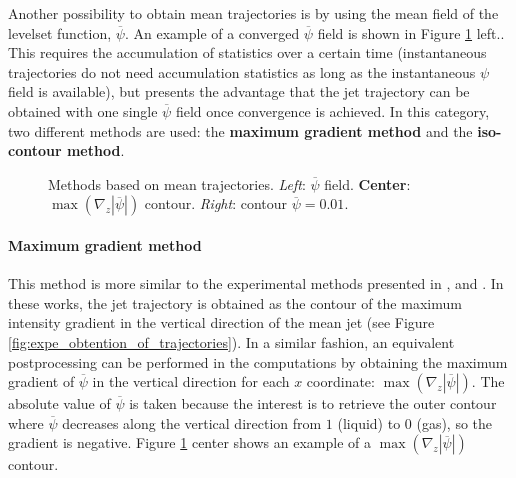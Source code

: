 Another possibility to obtain mean trajectories is by using the mean field of the levelset function, $\overline{\psi}$. An example of a converged $\overline{\psi}$ field is shown in Figure \ref{fig:trajectory_obtention_mean_methods_c_d} left.. This requires the accumulation of statistics over a certain time (instantaneous trajectories do not need accumulation statistics as long as the instantaneous $\psi$ field is available), but presents the advantage that the jet trajectory can be obtained with one single $\overline{\psi}$ field once convergence is achieved. In this category, two different methods are used: the \textbf{maximum gradient method} and the \textbf{iso-contour method}.

\begin{figure}[ht]
     \centering
     \caption[Methods based on mean trajectories]{Methods based on mean trajectories. \textsl{Left}: $\overline{\psi}$ field. \textbf{Center}: $\max \left( \nabla_z | \overline{\psi} | \right)$ contour. \textsl{Right}: contour $\overline{\psi} = 0.01$.}
      \label{fig:trajectory_obtention_mean_methods_c_d}
\end{figure}



\paragraph{Maximum gradient method}

This method is more similar to the experimental methods presented in ,  and . In these works, the jet trajectory is obtained as the contour of the maximum intensity gradient in the vertical direction of the mean jet (see Figure \ref{fig:expe_obtention_of_trajectories}). In a similar fashion, an equivalent postprocessing can be performed in the computations by obtaining the maximum gradient of $\overline{\psi}$ in the vertical direction for each $x$ coordinate: $\max \left( \nabla_z | \overline{\psi} | \right)$. The absolute value of $\overline{\psi}$ is taken because the interest is to retrieve the outer contour where $\overline{\psi}$ decreases along the vertical direction from $1$ (liquid) to 0 (gas), so the gradient is negative. Figure \ref{fig:trajectory_obtention_mean_methods_c_d} center shows an example of a $\max \left( \nabla_z | \overline{\psi} | \right)$ contour. \\


